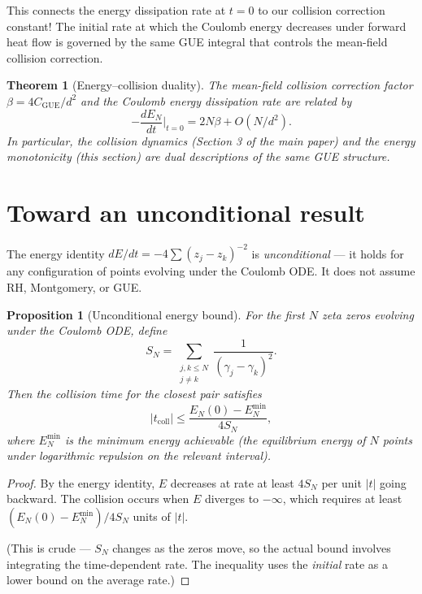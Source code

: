 \documentclass[11pt,a4paper]{article}
\newtheorem{theorem}{Theorem}
\newtheorem{proposition}{Proposition}
\begin{document}
This connects the energy dissipation rate at $t = 0$ to our
collision correction constant! The initial rate at which the
Coulomb energy decreases under forward heat flow is governed
by the same GUE integral that controls the mean-field collision
correction.

\begin{theorem}[Energy--collision duality]\label{thm:duality}
  The mean-field collision correction factor $\beta = 4C_{\mathrm{GUE}}/d^2$
  and the Coulomb energy dissipation rate are related by
  \begin{equation}
    -\frac{dE_N}{dt}\bigg|_{t=0} = 2N\beta + O(N/d^2).
  \end{equation}
  In particular, the collision dynamics (Section 3 of the main paper)
  and the energy monotonicity (this section) are dual descriptions
  of the same GUE structure.
\end{theorem}

\section{Toward an unconditional result}

The energy identity $dE/dt = -4\sum (z_j - z_k)^{-2}$ is
\emph{unconditional} --- it holds for any configuration of points
evolving under the Coulomb ODE. It does not assume RH, Montgomery,
or GUE.

\begin{proposition}[Unconditional energy bound]
  \label{prop:unconditional}
  For the first $N$ zeta zeros evolving under the Coulomb ODE,
  define
  \[
    S_N = \sum_{\substack{j,k \leq N \\ j \neq k}}
    \frac{1}{(\gamma_j - \gamma_k)^2}.
  \]
  Then the collision time for the closest pair satisfies
  \begin{equation}\label{eq:tcoll-energy}
    |t_{\mathrm{coll}}| \leq \frac{E_N(0) - E_N^{\min}}{4S_N},
  \end{equation}
  where $E_N^{\min}$ is the minimum energy achievable (the
  equilibrium energy of $N$ points under logarithmic repulsion
  on the relevant interval).
\end{proposition}

\begin{proof}
  By the energy identity, $E$ decreases at rate at least $4S_N$
  per unit $|t|$ going backward. The collision occurs when $E$
  diverges to $-\infty$, which requires at least
  $(E_N(0) - E_N^{\min})/4S_N$ units of $|t|$.

  (This is crude --- $S_N$ changes as the zeros move, so the
  actual bound involves integrating the time-dependent rate.
  The inequality uses the \emph{initial} rate as a lower bound
  on the average rate.)
\end{proof}
\end{document}
